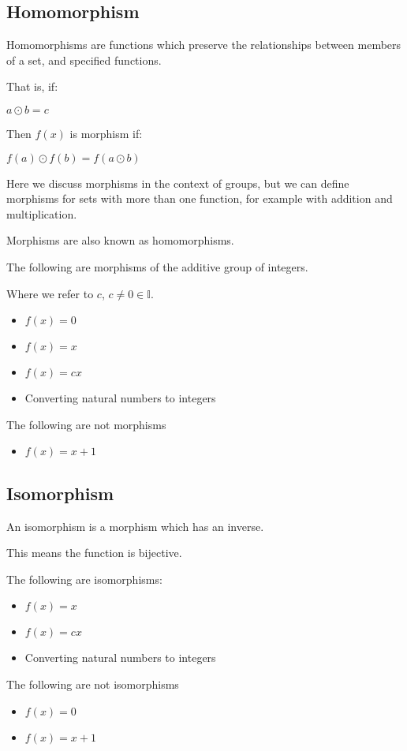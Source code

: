
\subsection{Homomorphism}

Homomorphisms are functions which preserve the relationships between members of a set, and specified functions.

That is, if:

\(a\odot b=c\)

Then \(f(x)\) is morphism if:

\(f(a)\odot f(b)=f(a\odot b)\)

Here we discuss morphisms in the context of groups, but we can define morphisms for sets with more than one function, for example with addition and multiplication.

Morphisms are also known as homomorphisms.

The following are morphisms of the additive group of integers.

Where we refer to \(c\), \(c\ne 0\in \mathbb{I}\).

\begin{itemize}
\item \(f(x)=0\)
\item \(f(x)=x\)
\item \(f(x)=cx\)
\item Converting natural numbers to integers
\end{itemize}

The following are not morphisms

\begin{itemize}
\item \(f(x)=x+1\)
\end{itemize}

\subsection{Isomorphism}

An isomorphism is a morphism which has an inverse.

This means the function is bijective.

The following are isomorphisms:

\begin{itemize}
\item \(f(x)=x\)
\item \(f(x)=cx\)
\item Converting natural numbers to integers
\end{itemize}

The following are not isomorphisms

\begin{itemize}
\item \(f(x)=0\)
\item \(f(x)=x+1\)
\end{itemize}

